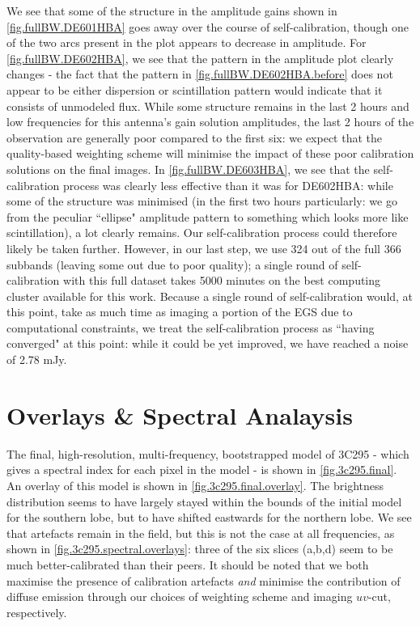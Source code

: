 \pg
We see that some of the structure in the amplitude gains shown in \cref{fig.fullBW.DE601HBA} goes away over the course of self-calibration, though one of the two arcs present in the plot appears to decrease in amplitude. For \cref{fig.fullBW.DE602HBA}, we see that the pattern in the amplitude plot clearly changes - the fact that the pattern in \cref{fig.fullBW.DE602HBA.before} does not appear to be either dispersion or scintillation pattern would indicate that it consists of unmodeled flux. While some structure remains in the last 2 hours and low frequencies for this antenna's gain solution amplitudes, the last 2 hours of the observation are generally poor compared to the first six: we expect that the quality-based weighting scheme will minimise the impact of these poor calibration solutions on the final images. In \cref{fig.fullBW.DE603HBA}, we see that the self-calibration process was clearly less effective than it was for DE602HBA: while some of the structure was minimised (in the first two hours particularly: we go from the peculiar ``ellipse" amplitude pattern to something which looks more like scintillation), a lot clearly remains. Our self-calibration process could therefore likely be taken further. However, in our last step, we use 324 out of the full 366 subbands (leaving some out due to poor quality); a single round of self-calibration with this full dataset takes 5000 minutes on the best computing cluster available for this work. Because a single round of self-calibration would, at this point, take as much time as imaging a portion of the EGS due to computational constraints, we treat the self-calibration process as ``having converged" at this point: while it could be yet improved, we have reached a noise of 2.78 mJy. 


\clearpage
\section{Overlays \& Spectral Analaysis}

\pg
The final, high-resolution, multi-frequency, bootstrapped model of 3C295 - which gives a spectral index for each pixel in the model - is shown in \cref{fig.3c295.final}. An overlay of this model is shown in \cref{fig.3c295.final.overlay}. The brightness distribution seems to have largely stayed within the bounds of the initial model for the southern lobe, but to have shifted eastwards for the northern lobe. We see that artefacts remain in the field, but this is not the case at all frequencies, as shown in \cref{fig.3c295.spectral.overlays}: three of the six slices (a,b,d) seem to be much better-calibrated than their peers. It should be noted that we both maximise the presence of calibration artefacts \textit{and} minimise the contribution of diffuse emission through our choices of weighting scheme and imaging $uv$-cut, respectively.


